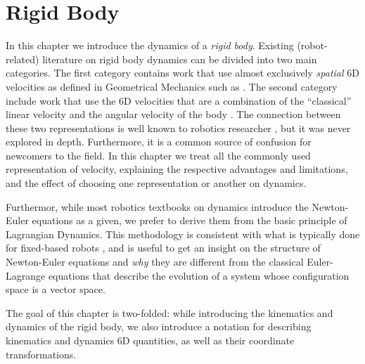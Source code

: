 
\chapter{Rigid Body}
\label{chap:rigid-body}

\ifpdf
    \graphicspath{{Chapter2/Figs/Raster/}{Chapter2/Figs/PDF/}{Chapter2/Figs/}}
\else
    \graphicspath{{Chapter2/Figs/Vector/}{Chapter2/Figs/}}
\fi

In this chapter we introduce the dynamics of a \emph{rigid body}. 
Existing (robot-related) literature on rigid body dynamics can be divided into two main categories. The first category contains work that use almost exclusively \emph{spatial} 6D velocities as defined in Geometrical Mechanics such as \citep{featherstone2008,Featherstone2016,jain2010,murray1994}. The second category include work that use the 6D velocities that are a combination of the ``classical'' linear velocity and the angular velocity of the body \citep{spong2006,siciliano2010robotics,Chiaverini2016}. The connection between these two representations is well known to robotics researcher \citep{murray1994,bruyninckx1996symbolic,englsberger2016}, but it was never explored in depth. Furthermore, it is a common source of confusion for newcomers to the field. In this chapter we treat all the commonly used representation of velocity, explaining the respective advantages and limitations, and the effect of choosing one representation or another on dynamics.

Furthermor, while most robotics textbooks on dynamics introduce the Newton-Euler equations as a given, we prefer to derive them from the basic principle of Lagrangian Dynamics. This methodology is consistent with what is typically done for fixed-based robots \citep{siciliano2010robotics,spong2006}, and is useful to get an insight on the structure of Newton-Euler equations and \emph{why} they are different from the classical Euler-Lagrange equations that describe the evolution of a system whose configuration space is a vector space. 

The goal of this chapter is two-folded: while introducing the kinematics and dynamics of the rigid body, we also introduce a notation for describing kinematics and dynamics 6D quantities,
as well as their coordinate transformations. 

